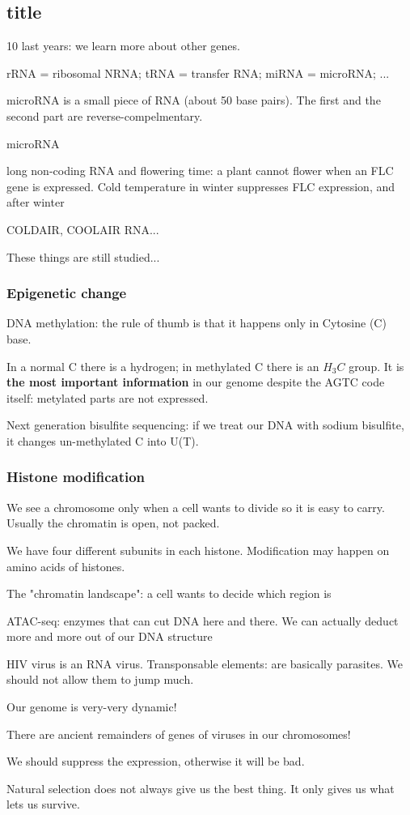 \documentclass[main.tex]{subfiles}
\begin{document}
\subsection{title}

10 last years: we learn more about other genes.

rRNA = ribosomal NRNA; tRNA = transfer RNA; miRNA = microRNA; ...

microRNA is a small piece of RNA (about 50 base pairs).
The first and the second part are reverse-compelmentary.

microRNA

long non-coding RNA and flowering time: a plant cannot flower when an FLC gene is expressed.
Cold temperature in winter suppresses FLC expression, and after winter

COLDAIR, COOLAIR RNA...

These things are still studied...

\subsubsection{Epigenetic change}

DNA methylation: the rule of thumb is that it happens only in Cytosine (C) base.

In a normal C there is a hydrogen; in methylated C there is an $H_3 C$ group.
It is \textbf{the most important information} in our genome despite the AGTC code itself: metylated parts are not expressed.

Next generation bisulfite sequencing: if we treat our DNA with sodium bisulfite, it changes un-methylated C into U(T).

\subsubsection{Histone modification}

We see a chromosome only when a cell wants to divide so it is easy to carry.
Usually the chromatin is open, not packed.

We have four different subunits in each histone.
Modification may happen on amino acids of histones.

The "chromatin landscape": a cell wants to decide which region is 

ATAC-seq: enzymes that can cut DNA here and there.
We can actually deduct more and more out of our DNA structure

HIV virus is an RNA virus.
Transponsable elements: are basically parasites.
We should not allow them to jump much.

Our genome is very-very dynamic!

There are ancient remainders of genes of viruses in our chromosomes!

We should suppress the expression, otherwise it will be bad.

Natural selection does not always give us the best thing.
It only gives us what lets us survive.
\end{document}
